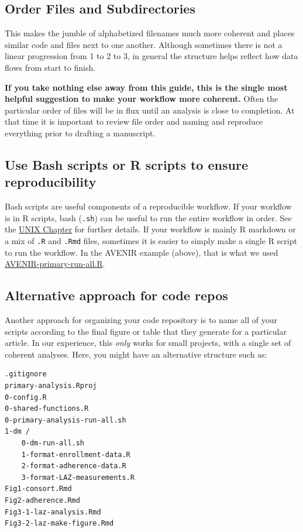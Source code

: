 \documentclass[
]{book}
\begin{document}
\subsection{Order Files and Subdirectories}\label{order-files-and-subdirectories}

This makes the jumble of alphabetized filenames much more coherent and places similar code and files next to one another. Although sometimes there is not a linear progression from 1 to 2 to 3, in general the structure helps reflect how data flows from start to finish.

\textbf{If you take nothing else away from this guide, this is the single most helpful suggestion to make your workflow more coherent.} Often the particular order of files will be in flux until an analysis is close to completion. At that time it is important to review file order and naming and reproduce everything prior to drafting a manuscript.

\subsection{Use Bash scripts or R scripts to ensure reproducibility}\label{use-bash-scripts-or-r-scripts-to-ensure-reproducibility}

Bash scripts are useful components of a reproducible workflow. If your workflow is in R scripts, bash (\texttt{.sh}) can be useful to run the entire workflow in order. See the \hyperref[unix]{UNIX Chapter} for further details. If your workflow is mainly R markdown or a mix of \texttt{.R} and \texttt{.Rmd} files, sometimes it is easier to simply make a single R script to run the workflow. In the AVENIR example (above), that is what we used \href{https://github.com/proctor-ucsf/AVENIR-primary/blob/main/R/AVENIR-primary-run-all.R}{AVENIR-primary-run-all.R}.

\subsection{Alternative approach for code repos}\label{alternative-approach-for-code-repos}

Another approach for organizing your code repository is to name all of your scripts according to the final figure or table that they generate for a particular article. In our experience, this \emph{only} works for small projects, with a single set of coherent analyses. Here, you might have an alternative structure such as:

\begin{verbatim}
.gitignore
primary-analysis.Rproj
0-config.R
0-shared-functions.R
0-primary-analysis-run-all.sh
1-dm /
    0-dm-run-all.sh
    1-format-enrollment-data.R
    2-format-adherence-data.R
    3-format-LAZ-measurements.R
Fig1-consort.Rmd
Fig2-adherence.Rmd
Fig3-1-laz-analysis.Rmd
Fig3-2-laz-make-figure.Rmd
\end{verbatim}
\end{document}
